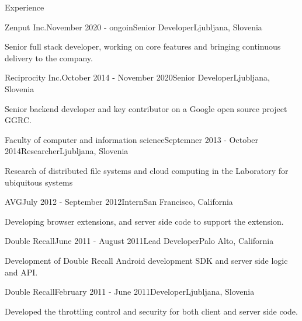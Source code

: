 \documentclass{resume} %
\begin{document}
\begin{rSection}{Experience}

\begin{rSubsection}{Zenput Inc.}{November 2020 - ongoin}{Senior Developer}{Ljubljana, Slovenia}
\item Senior full stack developer, working on core features and bringing continuous delivery to the company.
\end{rSubsection}


\begin{rSubsection}{Reciprocity Inc.}{October 2014 - November 2020}{Senior Developer}{Ljubljana, Slovenia}
\item Senior backend developer and key contributor on a Google open source project GGRC.
\end{rSubsection}


\begin{rSubsection}{Faculty of computer and information science}{Septemner 2013 - October 2014}{Researcher}{Ljubljana, Slovenia}
\item Research of distributed file systems and cloud computing in the Laboratory for ubiquitous systems
\end{rSubsection}


\begin{rSubsection}{AVG}{July 2012 - September 2012}{Intern}{San Francisco, California}
\item Developing browser extensions, and server side code to support the extension.
\end{rSubsection}


\begin{rSubsection}{Double Recall}{June 2011 - August 2011}{Lead Developer}{Palo Alto, California}
\item Development of Double Recall Android development SDK and server side logic and API.
\end{rSubsection}


\begin{rSubsection}{Double Recall}{February 2011 - June 2011}{Developer}{Ljubljana, Slovenia}
\item Developed the throttling control and security for both client and server side code.
\end{rSubsection}


\end{rSection}
\end{document}
